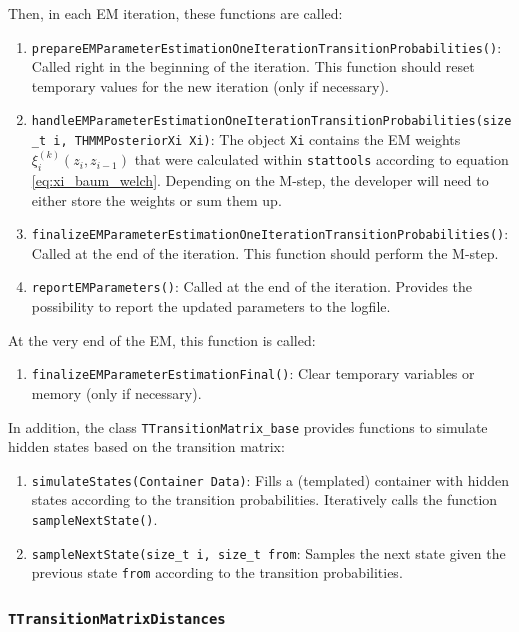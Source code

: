 \documentclass[a4paper,11pt]{article}
\def\stattools{\texttt{stattools}}
\newcommand{\class}[1]{\texttt{#1}}
\newcommand{\func}[1]{\texttt{#1}}
\newcommand{\pubfunc}[1]{\texttt{#1()}}
\newcommand{\variable}[1]{\texttt{#1}}
\begin{document}
Then, in each EM iteration, these functions are called:
\begin{enumerate}
 \item \pubfunc{prepareEMParameterEstimationOneIterationTransitionProbabilities}: Called right in the beginning of the iteration. This function should reset temporary values for the new iteration (only if necessary).
 \item \func{handleEMParameterEstimationOneIterationTransitionProbabilities(size\_t i, THMMPosteriorXi Xi)}: The object \variable{Xi} contains the EM weights $\xi_i^{(k)}(z_i , z_{i-1})$ that were calculated within \stattools{} according to equation \eqref{eq:xi_baum_welch}. Depending on the M-step, the developer will need to either store the weights or sum them up.
 \item \pubfunc{finalizeEMParameterEstimationOneIterationTransitionProbabilities}: Called at the end of the iteration. This function should perform the M-step.
 \item \pubfunc{reportEMParameters}: Called at the end of the iteration. Provides the possibility to report the updated parameters to the logfile.
\end{enumerate}

At the very end of the EM, this function is called:
\begin{enumerate}
 \item \pubfunc{finalizeEMParameterEstimationFinal}: Clear temporary variables or memory (only if necessary).
\end{enumerate}

In addition, the class \class{TTransitionMatrix\_base} provides functions to simulate hidden states based on the transition matrix:

\begin{enumerate}
 \item \func{simulateStates(Container Data)}: Fills a (templated) container with hidden states according to the transition probabilities. Iteratively calls the function \pubfunc{sampleNextState}.
 \item \func{sampleNextState(size\_t i, size\_t from}: Samples the next state given the previous state \variable{from} according to the transition probabilities.
\end{enumerate}

\subsubsection{\class{TTransitionMatrixDistances}}
\end{document}
